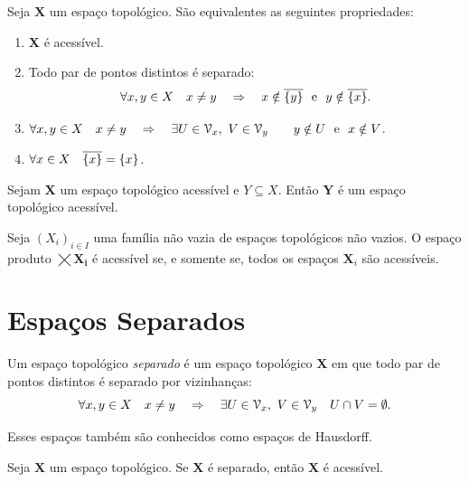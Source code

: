 \begin{prop}
	Seja $\bm X$ um espaço topológico. São equivalentes as seguintes propriedades:
	\begin{enumerate}
	\item $\bm X$ é acessível.
	\item Todo par de pontos distintos é separado:
		\begin{equation*}
		\forall x,y \in X \quad x \neq y \quad \Rightarrow \quad x \notin \overline{\{y\}} \text{\ \ e\ \ } y \notin \overline{\{x\}}.
		\end{equation*}
	\item $\forall x,y \in X \quad x \neq y \quad \Rightarrow \quad \exists U \in \mathcal{V}_x,\ V \in \mathcal{V}_y \qquad y \notin U \text{\ \ e\ \ } x \notin V$.
	\item $\forall x \in X \quad \overline{\{x\}}=\{x\}$.
	\end{enumerate}
\end{prop}

\begin{prop}
	Sejam $\bm X$ um espaço topológico acessível e  $Y \subseteq X$. Então $\bm Y$ é um espaço topológico acessível.
\end{prop}

\begin{prop}
	Seja $(X_i)_{i \in I}$ uma família não vazia de espaços topológicos não vazios. O espaço produto $\bm{\bigtimes X_i}$ é acessível se, e somente se, todos os espaços $\bm X_i$ são acessíveis.
\end{prop}

\section{Espaços Separados}

\begin{defi}[$T_2$]
	Um espaço topológico \emph{separado} é um espaço topológico $\bm X$ em que todo par de pontos distintos é separado por vizinhanças:
	\begin{equation*}
	\forall x,y \in X \quad x \neq y \quad \Rightarrow \quad \exists U \in \mathcal{V}_x,\ V \in \mathcal{V}_y \quad U \cap V = \emptyset.
	\end{equation*}
\end{defi}
Esses espaços também são conhecidos como espaços de Hausdorff.

\begin{prop}[$T_2 \Rightarrow T_1$]
	Seja $\bm X$ um espaço topológico. Se $\bm X$ é separado, então $\bm X$ é acessível.
\end{prop}

